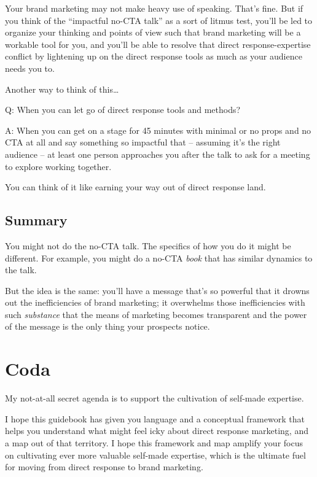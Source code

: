 \documentclass[13pt,]{tufte-handout}
\begin{document}
Your brand marketing may not make heavy use of speaking. That's fine.
But if you think of the ``impactful no-CTA talk'' as a sort of litmus
test, you'll be led to organize your thinking and points of view such
that brand marketing will be a workable tool for you, and you'll be able
to resolve that direct response-expertise conflict by lightening up on
the direct response tools as much as your audience needs you to.

Another way to think of this\ldots{}

Q: When you can let go of direct response tools and methods?

A: When you can get on a stage for 45 minutes with minimal or no props
and no CTA at all and say something so impactful that -- assuming it's
the right audience -- at least one person approaches you after the talk
to ask for a meeting to explore working together.

You can think of it like earning your way out of direct response land.

\hypertarget{summary-4}{%
\subsection{Summary}\label{summary-4}}

You might not do the no-CTA talk. The specifics of how you do it might
be different. For example, you might do a no-CTA \emph{book} that has
similar dynamics to the talk.

But the idea is the same: you'll have a message that's so powerful that
it drowns out the inefficiencies of brand marketing; it overwhelms those
inefficiencies with such \emph{substance} that the means of marketing
becomes transparent and the power of the message is the only thing your
prospects notice.

\hypertarget{coda}{%
\section{Coda}\label{coda}}

My not-at-all secret agenda is to support the cultivation of self-made
expertise.

I hope this guidebook has given you language and a conceptual framework
that helps you understand what might feel icky about direct response
marketing, and a map out of that territory. I hope this framework and
map amplify your focus on cultivating ever more valuable self-made
expertise, which is the ultimate fuel for moving from direct response to
brand marketing.
\end{document}
